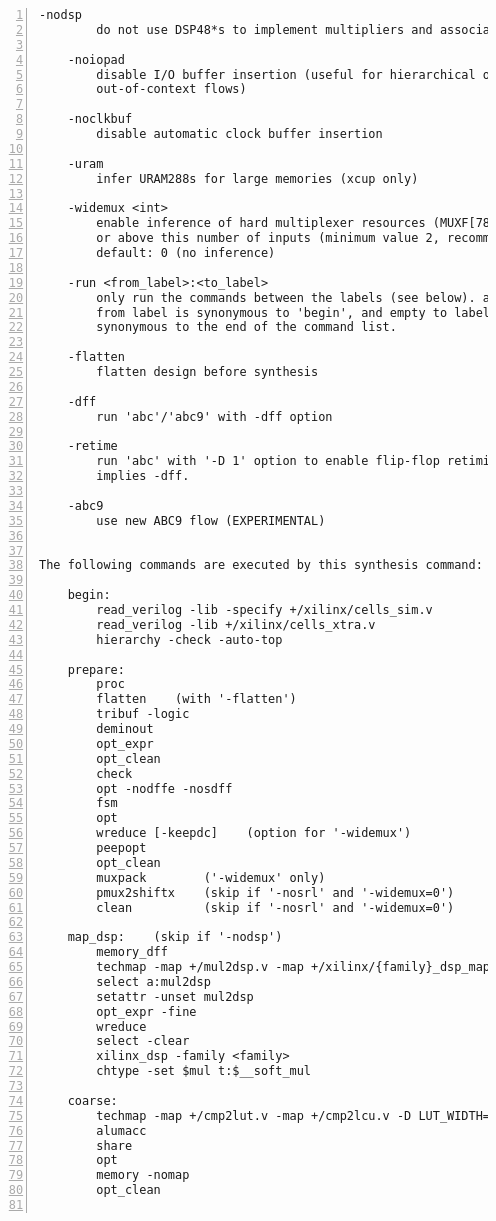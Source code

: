\begin{lstlisting}[numbers=left,frame=single]
    -nodsp
        do not use DSP48*s to implement multipliers and associated logic

    -noiopad
        disable I/O buffer insertion (useful for hierarchical or 
        out-of-context flows)

    -noclkbuf
        disable automatic clock buffer insertion

    -uram
        infer URAM288s for large memories (xcup only)

    -widemux <int>
        enable inference of hard multiplexer resources (MUXF[78]) for muxes at
        or above this number of inputs (minimum value 2, recommended value >= 5)
        default: 0 (no inference)

    -run <from_label>:<to_label>
        only run the commands between the labels (see below). an empty
        from label is synonymous to 'begin', and empty to label is
        synonymous to the end of the command list.

    -flatten
        flatten design before synthesis

    -dff
        run 'abc'/'abc9' with -dff option

    -retime
        run 'abc' with '-D 1' option to enable flip-flop retiming.
        implies -dff.

    -abc9
        use new ABC9 flow (EXPERIMENTAL)


The following commands are executed by this synthesis command:

    begin:
        read_verilog -lib -specify +/xilinx/cells_sim.v
        read_verilog -lib +/xilinx/cells_xtra.v
        hierarchy -check -auto-top

    prepare:
        proc
        flatten    (with '-flatten')
        tribuf -logic
        deminout
        opt_expr
        opt_clean
        check
        opt -nodffe -nosdff
        fsm
        opt
        wreduce [-keepdc]    (option for '-widemux')
        peepopt
        opt_clean
        muxpack        ('-widemux' only)
        pmux2shiftx    (skip if '-nosrl' and '-widemux=0')
        clean          (skip if '-nosrl' and '-widemux=0')

    map_dsp:    (skip if '-nodsp')
        memory_dff
        techmap -map +/mul2dsp.v -map +/xilinx/{family}_dsp_map.v {options}
        select a:mul2dsp
        setattr -unset mul2dsp
        opt_expr -fine
        wreduce
        select -clear
        xilinx_dsp -family <family>
        chtype -set $mul t:$__soft_mul

    coarse:
        techmap -map +/cmp2lut.v -map +/cmp2lcu.v -D LUT_WIDTH=[46]
        alumacc
        share
        opt
        memory -nomap
        opt_clean


\end{lstlisting}
